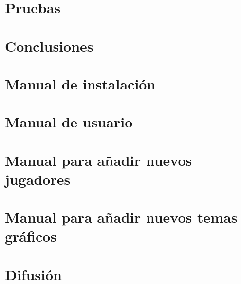 \documentclass[a4paper,11pt,spanish]{book}
\begin{document}
\chapter{Pruebas}


\chapter{Conclusiones}



\appendix

\chapter{Manual de instalación}


\chapter{Manual de usuario}


\chapter{Manual para añadir nuevos jugadores}


\chapter{Manual para añadir nuevos temas gráficos}


\chapter{Difusión}


%

%

\clearpage
{}




\end{document}
